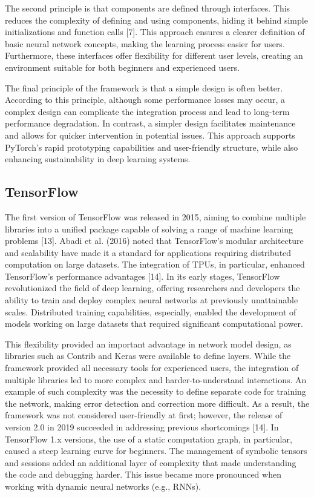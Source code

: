 \documentclass[conference]{IEEEtran}
\begin{document}
The second principle is that components are defined through interfaces. This reduces the complexity of defining and using components, hiding it behind simple initializations and function calls [7]. This approach ensures a clearer definition of basic neural network concepts, making the learning process easier for users. Furthermore, these interfaces offer flexibility for different user levels, creating an environment suitable for both beginners and experienced users.

The final principle of the framework is that a simple design is often better. According to this principle, although some performance losses may occur, a complex design can complicate the integration process and lead to long-term performance degradation. In contrast, a simpler design facilitates maintenance and allows for quicker intervention in potential issues. This approach supports PyTorch’s rapid prototyping capabilities and user-friendly structure, while also enhancing sustainability in deep learning systems.

\subsection{TensorFlow}
The first version of TensorFlow was released in 2015, aiming to combine multiple libraries into a unified package capable of solving a range of machine learning problems [13]. Abadi et al. (2016) noted that TensorFlow's modular architecture and scalability have made it a standard for applications requiring distributed computation on large datasets. The integration of TPUs, in particular, enhanced TensorFlow's performance advantages [14]. In its early stages, TensorFlow revolutionized the field of deep learning, offering researchers and developers the ability to train and deploy complex neural networks at previously unattainable scales. Distributed training capabilities, especially, enabled the development of models working on large datasets that required significant computational power.

This flexibility provided an important advantage in network model design, as libraries such as Contrib and Keras were available to define layers. While the framework provided all necessary tools for experienced users, the integration of multiple libraries led to more complex and harder-to-understand interactions. An example of such complexity was the necessity to define separate code for training the network, making error detection and correction more difficult. As a result, the framework was not considered user-friendly at first; however, the release of version 2.0 in 2019 succeeded in addressing previous shortcomings [14]. In TensorFlow 1.x versions, the use of a static computation graph, in particular, caused a steep learning curve for beginners. The management of symbolic tensors and sessions added an additional layer of complexity that made understanding the code and debugging harder. This issue became more pronounced when working with dynamic neural networks (e.g., RNNs).
\end{document}
